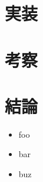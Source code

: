 \documentclass[11pt,a4j]{jarticle}
\begin{document}
  \section{実装}
  \section{考察}
  \section{結論}
    \begin{itemize}
      \item foo
      \item bar
      \item buz
    \end{itemize}

\end{document}

